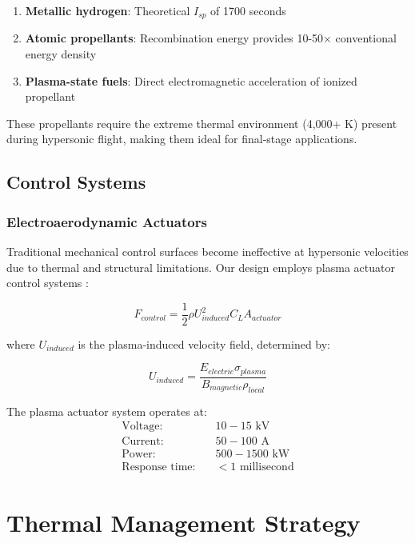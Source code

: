 \documentclass[12pt,a4paper]{article}
\begin{document}
\begin{enumerate}
\item \textbf{Metallic hydrogen}: Theoretical $I_{sp}$ of 1700 seconds \cite{silvera2017metallic}
\item \textbf{Atomic propellants}: Recombination energy provides 10-50× conventional energy density
\item \textbf{Plasma-state fuels}: Direct electromagnetic acceleration of ionized propellant
\end{enumerate}

These propellants require the extreme thermal environment (4,000+ K) present during hypersonic flight, making them ideal for final-stage applications.

\subsection{Control Systems}

\subsubsection{Electroaerodynamic Actuators}
Traditional mechanical control surfaces become ineffective at hypersonic velocities due to thermal and structural limitations. Our design employs plasma actuator control systems \cite{moreau2007airflow, roth2000electroaerodynamic}:

\begin{equation}
F_{control} = \frac{1}{2}\rho U_{induced}^2 C_L A_{actuator}
\label{eq:plasma_control_force}
\end{equation}

where $U_{induced}$ is the plasma-induced velocity field, determined by:

\begin{equation}
U_{induced} = \frac{E_{electric} \sigma_{plasma}}{B_{magnetic} \rho_{local}}
\label{eq:induced_velocity}
\end{equation}

The plasma actuator system operates at:
\begin{align}
\text{Voltage:} &\quad 10-15 \text{ kV} \\
\text{Current:} &\quad 50-100 \text{ A} \\
\text{Power:} &\quad 500-1500 \text{ kW} \\
\text{Response time:} &\quad < 1 \text{ millisecond}
\end{align}

\section{Thermal Management Strategy}
\end{document}
